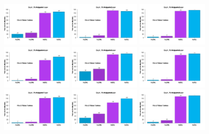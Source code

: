 \begin{figure}[th]
\centering
\includegraphics[width=0.30\textwidth]{Figures/MirrorRate_Exp1_P1} \includegraphics[width=0.30\textwidth]{Figures/MirrorRate_Exp1_P2} \includegraphics[width=0.30\textwidth]{Figures/MirrorRate_Exp1_P3}
\includegraphics[width=0.30\textwidth]{Figures/MirrorRate_Exp1_P4} \includegraphics[width=0.30\textwidth]{Figures/MirrorRate_Exp1_P5} \includegraphics[width=0.30\textwidth]{Figures/MirrorRate_Exp1_P6}
\includegraphics[width=0.30\textwidth]{Figures/MirrorRate_Exp1_P7} \includegraphics[width=0.30\textwidth]{Figures/MirrorRate_Exp1_P8} \includegraphics[width=0.30\textwidth]{Figures/MirrorRate_Exp1_P9}

\end{figure}
